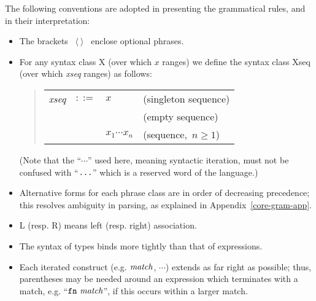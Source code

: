 The following conventions are adopted in presenting the grammatical rules,
and in their interpretation:
\begin{itemize}
  \item The brackets ~$\langle\ \rangle$~ enclose optional phrases.
  \item For any syntax class X (over which $x$ ranges)
we define the syntax class Xseq (over which {\it xseq} ranges) as follows:
    \begin{quote}
    \begin{tabular}{rcll}
       {\it xseq} & $::=$ & $x$ & (singleton sequence)\\
                  &       &     & (empty sequence)\\
                  &       & \ml{(}$x_1$\ml{,}$\cdots$\ml{,}$x_n$\ml{)}
                                & (sequence,~$n\geq 1$) \\
    \end{tabular}
    \end{quote}
(Note that the ``$\cdots$'' used here, meaning syntactic iteration, must not be
confused with ``$\mbox{{\tt ...}}$'' which is a reserved word of the language.)
  \item Alternative forms for each phrase class are in order of decreasing
        precedence; this resolves ambiguity in parsing, as explained
        in Appendix~\ref{core-gram-app}.
  \item L (resp. R) means left (resp. right) association.

\item The syntax of types binds more tightly than that of expressions.

\item Each iterated construct (e.g. ${\it match}$, $\cdots$)
extends as far
right as possible; thus, parentheses may be needed around an expression which
terminates with a match, e.g. ``${\tt fn}\ {\it match}$'', if this occurs within a
larger
match.
\end{itemize}

